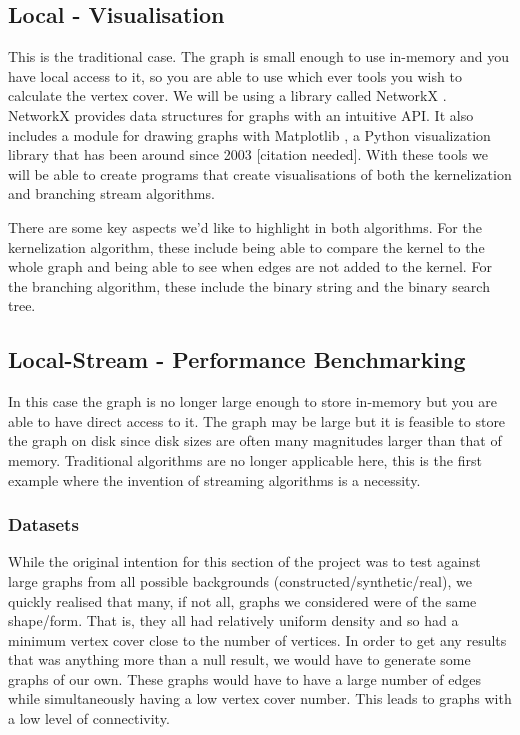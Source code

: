 \subsection{Local - Visualisation}

This is the traditional case. The graph is small enough to use in-memory and
you have local access to it, so you are able to use which ever tools you wish
to calculate the vertex cover. We will be using a library called NetworkX
\cite{hagberg2008exploring}. NetworkX provides data structures for graphs with
an intuitive API. It also includes a module for drawing graphs with Matplotlib
\cite{hunter2007matplotlib}, a Python visualization library that has been
around since 2003 [citation needed]. With these tools we will be able to create
programs that create visualisations of both the kernelization and branching
stream algorithms.

There are some key aspects we'd like to highlight in both algorithms. For the
kernelization algorithm, these include being able to compare the kernel to the
whole graph and being able to see when edges are not added to the kernel. For
the branching algorithm, these include the binary string and the binary search
tree.


\subsection{Local-Stream - Performance Benchmarking}

In this case the graph is no longer large enough to store in-memory but you are
able to have direct access to it. The graph may be large but it is feasible to
store the graph on disk since disk sizes are often many magnitudes larger than
that of memory. Traditional algorithms are no longer applicable here, this is
the first example where the invention of streaming algorithms is a necessity.

\subsubsection{Datasets}

While the original intention for this section of the project was to test
against large graphs from all possible backgrounds
(constructed/synthetic/real), we quickly realised that many, if not all, graphs
we considered were of the same shape/form. That is, they all had relatively
uniform density and so had a minimum vertex cover close to the number of
vertices. In order to get any results that was anything more than a null
result, we would have to generate some graphs of our own. These graphs would
have to have a large number of edges while simultaneously having a low vertex
cover number. This leads to graphs with a low level of connectivity.

